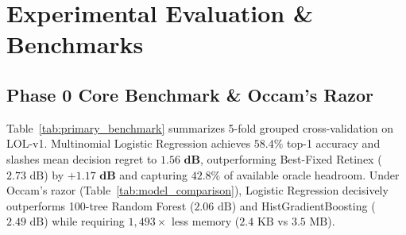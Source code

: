 \documentclass[journal]{IEEEtran}
\begin{document}
\section{Experimental Evaluation \& Benchmarks}

\subsection{Phase 0 Core Benchmark \& Occam's Razor}
Table~\ref{tab:primary_benchmark} summarizes 5-fold grouped cross-validation on LOL-v1. Multinomial Logistic Regression achieves $\mathbf{58.4\%}$ top-1 accuracy and slashes mean decision regret to $\mathbf{1.56\text{ dB}}$, outperforming Best-Fixed Retinex ($2.73\text{ dB}$) by $\mathbf{+1.17\text{ dB}}$ and capturing $\mathbf{42.8\%}$ of available oracle headroom. Under Occam's razor (Table~\ref{tab:model_comparison}), Logistic Regression decisively outperforms 100-tree Random Forest ($2.06\text{ dB}$) and HistGradientBoosting ($2.49\text{ dB}$) while requiring $1,493\times$ less memory ($2.4\text{ KB}$ vs $3.5\text{ MB}$).

\begin{table}[!t]
\caption{Primary Model Comparison under 5-Fold Scene-Grouped CV across 3 Seeds (15 Evaluations) on LOL-v1 \cite{wei2018deep}.}
\label{tab:primary_benchmark}
\centering
{}
\end{table}
\end{document}
